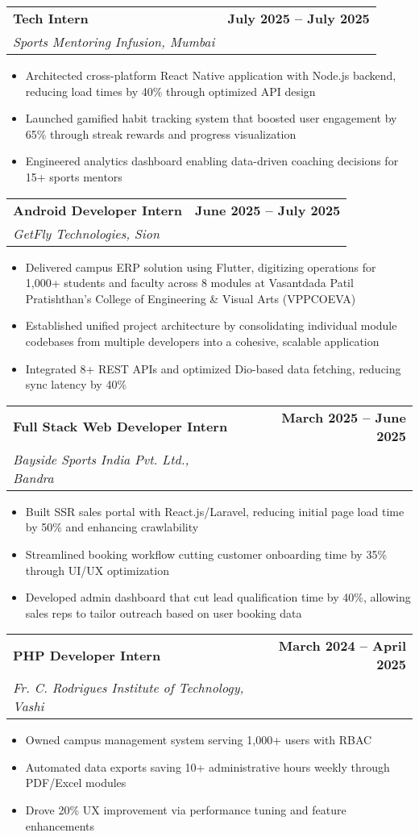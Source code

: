\documentclass[10pt,a4paper]{article}
\makeatletter
\newcommand{\resumeItem}[1]{\item\small{#1}}
\newcommand{\resumeSubheading}[4]{
  \vspace{-1pt}
  \begin{tabular*}{\textwidth}[t]{l@{\extracolsep{\fill}}r}
    \textbf{#1} & \textcolor{light}{\small\textbf{#2}} \\
    \textit{\small#3} & \textcolor{light}{\small#4} \\
  \end{tabular*}\vspace{-5pt}
}
\makeatother
\begin{document}
\vspace{0.1em}

\resumeSubheading
{Tech Intern}{July 2025 -- July 2025}
{Sports Mentoring Infusion, Mumbai}{}
\begin{itemize}
    \resumeItem{Architected cross-platform React Native application with Node.js backend, reducing load times by 40\% through optimized API design}
    \resumeItem{Launched gamified habit tracking system that boosted user engagement by 65\% through streak rewards and progress visualization}
    \resumeItem{Engineered analytics dashboard enabling data-driven coaching decisions for 15+ sports mentors}
\end{itemize}

\vspace{0.1em}

\resumeSubheading
{Android Developer Intern}{June 2025 -- July 2025}
{GetFly Technologies, Sion}{}
\begin{itemize}
    \resumeItem{Delivered campus ERP solution using Flutter, digitizing operations for 1,000+ students and faculty across 8 modules at Vasantdada Patil Pratishthan’s College of Engineering \& Visual Arts (VPPCOEVA)}
\resumeItem{Established unified project architecture by consolidating individual module codebases from multiple developers into a cohesive, scalable application}
\resumeItem{Integrated 8+ REST APIs and optimized Dio-based data fetching, reducing sync latency by 40\%}

\end{itemize}

\vspace{0.1em}

\resumeSubheading
{Full Stack Web Developer Intern}{March 2025 -- June 2025}
{Bayside Sports India Pvt. Ltd., Bandra}{}
\begin{itemize}
    \resumeItem{Built SSR sales portal with React.js/Laravel, reducing initial page load time by 50\% and enhancing crawlability}
    \resumeItem{Streamlined booking workflow cutting customer onboarding time by 35\% through UI/UX optimization}
    \resumeItem{Developed admin dashboard that cut lead qualification time by 40\%, allowing sales reps to tailor outreach based on user booking data}
\end{itemize}

\vspace{0.1em}

\resumeSubheading
{PHP Developer Intern}{March 2024 -- April 2025}  
{Fr. C. Rodrigues Institute of Technology, Vashi}{}
\begin{itemize}
    \resumeItem{Owned campus management system serving 1,000+ users with RBAC}
    \resumeItem{Automated data exports saving 10+ administrative hours weekly through PDF/Excel modules}
    \resumeItem{Drove 20\% UX improvement via performance tuning and feature enhancements}
\end{itemize}
\end{document}
